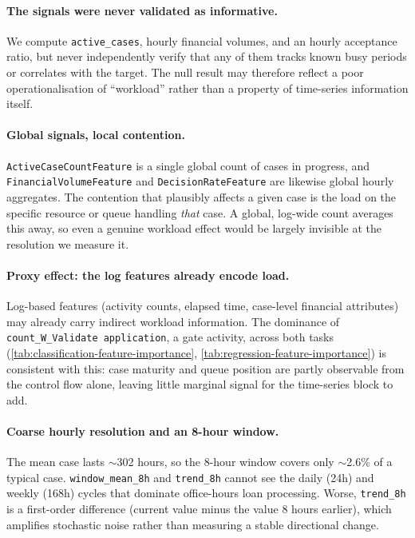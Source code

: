 \documentclass[runningheads]{llncs}
\begin{document}
\paragraph{The signals were never validated as informative.}
We compute \texttt{active\_cases}, hourly financial volumes, and an hourly
acceptance ratio, but never independently verify that any of them tracks known busy
periods or correlates with the target. The null result may therefore reflect a
poor operationalisation of ``workload'' rather than a property of time-series
information itself.

\paragraph{Global signals, local contention.}
\texttt{ActiveCaseCountFeature} is a single global count of cases in progress,
and \texttt{FinancialVolumeFeature} and \texttt{DecisionRateFeature} are
likewise global hourly aggregates. The contention that plausibly affects a
given case is the load on the specific resource or queue handling \emph{that}
case. A global, log-wide count averages this away, so even a genuine workload
effect would be largely invisible at the resolution we measure it.

\paragraph{Proxy effect: the log features already encode load.}
Log-based features (activity counts, elapsed time, case-level financial
attributes) may already carry indirect workload information. The dominance of
\texttt{count\_W\_Validate application}, a gate activity, across both tasks
(\autoref{tab:classification-feature-importance},
\autoref{tab:regression-feature-importance}) is consistent with this: case
maturity and queue position are partly observable from the control flow alone,
leaving little marginal signal for the time-series block to add.

\paragraph{Coarse hourly resolution and an 8-hour window.}
The mean case lasts $\sim$302 hours, so the 8-hour window covers only
$\sim$2.6\% of a typical case. \texttt{window\_mean\_8h} and \texttt{trend\_8h}
cannot see the daily (24h) and weekly (168h) cycles that dominate office-hours
loan processing. Worse, \texttt{trend\_8h} is a first-order difference (current
value minus the value 8 hours earlier), which amplifies stochastic noise rather
than measuring a stable directional change.
\end{document}
